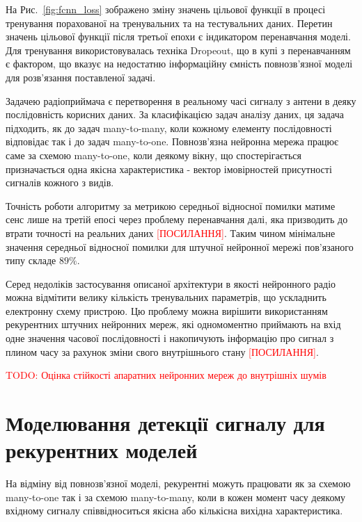 На Рис.~\ref{fig:fcnn_loss} зображено зміну значень цільової функції в 
процесі тренування порахованої на тренувальних та на тестувальних даних.
Перетин значень цільової функції після третьої епохи є індикатором 
перенавчання моделі. Для тренування використовувалась техніка Dropeout, 
що в купі з перенавчанням є фактором, що вказує на недостатню інформаційну
ємність повнозв'язної моделі для розв'язання поставленої задачі.

Задачею радіоприймача є перетворення в реальному часі сигналу з антени в 
деяку послідовність корисних даних. За класифікацією задач аналізу даних, 
ця задача підходить, як до задач many-to-many, коли кожному елементу 
послідовності відповідає так і до задач many-to-one. Повнозв'язна нейронна
мережа працює саме за схемою many-to-one, коли деякому вікну, що 
спостерігається призначається одна якісна характеристика -
вектор імовірностей присутності сигналів кожного з видів.

Точність роботи алгоритму за метрикою середньої відносної помилки
матиме сенс лише на третій епосі через проблему перенавчання далі, яка 
призводить до втрати точності на реальних даних \textcolor{red}{[ПОСИЛАННЯ]}. 
Таким чином мінімальне значення середньої відносної помилки для штучної 
нейронної мережі пов'язаного типу складе $ 89 \% $.

Серед недоліків застосування описаної архітектури в якості нейронного радіо
можна відмітити велику кількість тренувальних параметрів, що ускладнить 
електронну схему пристрою. Цю проблему можна вирішити використанням 
рекурентних штучних нейронних мереж, які одномоментно приймають на вхід 
одне значення часової послідовності і накопичують інформацію про сигнал 
з плином часу за рахунок зміни свого внутрішнього стану 
\textcolor{red}{[ПОСИЛАННЯ]}.

\textcolor{red}{TODO: Оцінка стійкості апаратних нейронних мереж до 
внутрішніх шумів}

\section{Моделювання детекції сигналу для рекурентних моделей}

На відміну від повнозв'язної моделі, рекурентні можуть працювати як за схемою
many-to-one так і за схемою many-to-many, коли в кожен момент часу деякому 
вхідному сигналу співвідноситься якісна або кількісна вихідна характеристика.

